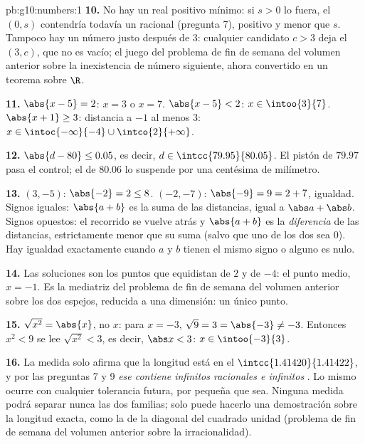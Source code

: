 \begin{solution}{pb:g10:numbers:1}
\textbf{10.} No hay un real positivo mínimo: si $s > 0$ lo fuera, el
 $(0, s)$ contendría todavía un racional (pregunta 7), positivo y
menor que $s$. Tampoco hay un número justo después de $3$: cualquier
candidato $c > 3$ deja el  $(3, c)$, que no es vacío; el juego
del problema de fin de semana del volumen anterior sobre la inexistencia
de número siguiente, ahora convertido en un teorema sobre $\R$.

\textbf{11.} $\abs{x - 5} = 2$: $x = 3$ o $x = 7$.
$\abs{x - 5} < 2$: $x \in \intoo{3}{7}$.
$\abs{x + 1} \geq 3$: distancia a $-1$ al menos $3$:
$x \in \intoc{-\infty}{-4} \cup \intco{2}{+\infty}$.

\textbf{12.} $\abs{d - 80} \leq 0.05$, es decir,
$d \in \intcc{79.95}{80.05}$. El pistón de $79.97$ pasa el control; el de
$80.06$ lo suspende por una centésima de milímetro.

\textbf{13.} $(3, -5)$: $\abs{-2} = 2 \leq 8$. $(-2, -7)$:
$\abs{-9} = 9 = 2 + 7$, igualdad. Signos iguales: $\abs{a + b}$ es la suma
de las distancias, igual a $\abs a + \abs b$. Signos opuestos: el
recorrido se vuelve atrás y $\abs{a + b}$ es la \emph{diferencia} de las
distancias, estrictamente menor que su suma (salvo que uno de los dos sea
$0$). Hay igualdad exactamente cuando $a$ y $b$ tienen el mismo signo o
alguno es nulo.

\textbf{14.} Las soluciones son los puntos que equidistan de $2$ y de
$-4$: el punto medio, $x = -1$. Es la mediatriz del problema de fin de
semana del volumen anterior sobre los dos espejos, reducida a una
dimensión: un único punto.

\textbf{15.} $\sqrt{x^2} = \abs{x}$, no $x$: para $x = -3$,
$\sqrt{9} = 3 = \abs{-3} \neq -3$. Entonces $x^2 < 9$ se lee
$\sqrt{x^2} < 3$, es decir, $\abs x < 3$: $x \in \intoo{-3}{3}$.

\textbf{16.} La medida solo afirma que la longitud está en el 
$\intcc{1.41420}{1.41422}$, y por las preguntas 7 y 9 \emph{ese 
contiene infinitos racionales e infinitos }. Lo mismo ocurre
con cualquier tolerancia futura, por pequeña que sea. Ninguna medida podrá
separar nunca las dos familias; solo puede hacerlo una demostración sobre
la longitud exacta, como la de la diagonal del cuadrado unidad (problema
de fin de semana del volumen anterior sobre la irracionalidad).


\end{solution}
